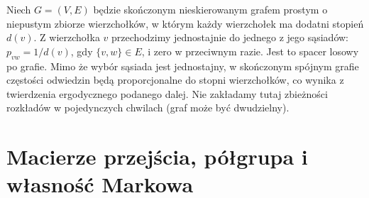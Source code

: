 \begin{przyklad}
Niech $G=(V,E)$ będzie skończonym nieskierowanym
grafem prostym o niepustym zbiorze wierzchołków,
w którym każdy wierzchołek ma dodatni stopień $d(v)$.
Z wierzchołka $v$ przechodzimy jednostajnie do jednego
z jego sąsiadów: $p_{vw}=1/d(v)$, gdy $\{v,w\}\in E$,
i zero w przeciwnym razie. Jest to spacer losowy
po grafie. Mimo że wybór sąsiada jest jednostajny,
w skończonym spójnym grafie częstości odwiedzin
będą proporcjonalne do stopni wierzchołków,
co wynika z twierdzenia ergodycznego podanego dalej.
Nie zakładamy tutaj zbieżności rozkładów w pojedynczych
chwilach (graf może być dwudzielny).
\end{przyklad}

\section{Macierze przejścia, półgrupa i własność Markowa}

